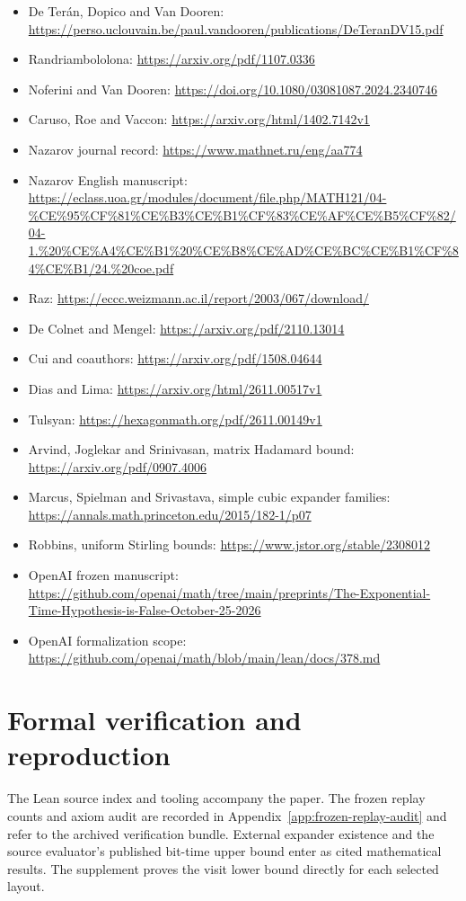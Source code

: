 \documentclass[
  11pt,
]{article}
\providecommand{\tightlist}{%
  \setlength{\itemsep}{0pt}\setlength{\parskip}{0pt}}
\begin{document}
\begin{itemize}
\tightlist
\item
  De Terán, Dopico and Van Dooren:
  \url{https://perso.uclouvain.be/paul.vandooren/publications/DeTeranDV15.pdf}
\item
  Randriambololona: \url{https://arxiv.org/pdf/1107.0336}
\item
  Noferini and Van Dooren:
  \url{https://doi.org/10.1080/03081087.2024.2340746}
\item
  Caruso, Roe and Vaccon: \url{https://arxiv.org/html/1402.7142v1}
\item
  Nazarov journal record: \url{https://www.mathnet.ru/eng/aa774}
\item
  Nazarov English manuscript:
  \url{https://eclass.uoa.gr/modules/document/file.php/MATH121/04-\%CE\%95\%CF\%81\%CE\%B3\%CE\%B1\%CF\%83\%CE\%AF\%CE\%B5\%CF\%82/04-1.\%20\%CE\%A4\%CE\%B1\%20\%CE\%B8\%CE\%AD\%CE\%BC\%CE\%B1\%CF\%84\%CE\%B1/24.\%20coe.pdf}
\item
  Raz: \url{https://eccc.weizmann.ac.il/report/2003/067/download/}
\item
  De Colnet and Mengel: \url{https://arxiv.org/pdf/2110.13014}
\item
  Cui and coauthors: \url{https://arxiv.org/pdf/1508.04644}
\item
  Dias and Lima: \url{https://arxiv.org/html/2611.00517v1}
\item
  Tulsyan: \url{https://hexagonmath.org/pdf/2611.00149v1}
\item
  Arvind, Joglekar and Srinivasan, matrix Hadamard bound:
  \url{https://arxiv.org/pdf/0907.4006}
\item
  Marcus, Spielman and Srivastava, simple cubic expander families:
  \url{https://annals.math.princeton.edu/2015/182-1/p07}
\item
  Robbins, uniform Stirling bounds:
  \url{https://www.jstor.org/stable/2308012}
\item
  OpenAI frozen manuscript:
  \url{https://github.com/openai/math/tree/main/preprints/The-Exponential-Time-Hypothesis-is-False-October-25-2026}
\item
  OpenAI formalization scope:
  \url{https://github.com/openai/math/blob/main/lean/docs/378.md}
\end{itemize}

\section{Formal verification and reproduction}\label{formal-verification-and-statement-coverage}
The Lean source index and tooling accompany the paper. The frozen replay counts and axiom audit are recorded in Appendix~\ref{app:frozen-replay-audit} and refer to the archived verification bundle. External expander existence and the source evaluator's published bit-time upper bound enter as cited mathematical results. The supplement proves the visit lower bound directly for each selected layout.
\end{document}
